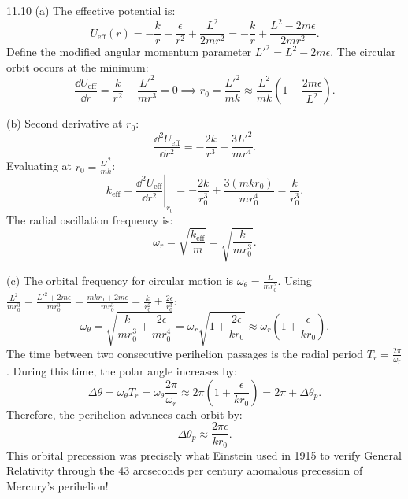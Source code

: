 \begin{tabletworkspace}[6.5cm]
\end{tabletworkspace}

\begin{solution}{11.10}
(a) The effective potential is:
\[
U_{\text{eff}}(r) = -\frac{k}{r} - \frac{\epsilon}{r^2} + \frac{L^2}{2mr^2} = -\frac{k}{r} + \frac{L^2 - 2m\epsilon}{2mr^2}.
\]
Define the modified angular momentum parameter $L'^2 = L^2 - 2m\epsilon$.
The circular orbit occurs at the minimum:
\[
\frac{\dd U_{\text{eff}}}{\dd r} = \frac{k}{r^2} - \frac{L'^2}{mr^3} = 0 \implies \boxed{r_0 = \frac{L'^2}{mk} \approx \frac{L^2}{mk}\left(1 - \frac{2m\epsilon}{L^2}\right).}
\]

(b) Second derivative at $r_0$:
\[
\frac{\dd^2 U_{\text{eff}}}{\dd r^2} = -\frac{2k}{r^3} + \frac{3L'^2}{mr^4}.
\]
Evaluating at $r_0 = \frac{L'^2}{mk}$:
\[
k_{\text{eff}} = \left.\frac{\dd^2 U_{\text{eff}}}{\dd r^2}\right|_{r_0} = -\frac{2k}{r_0^3} + \frac{3(mkr_0)}{mr_0^4} = \frac{k}{r_0^3}.
\]
The radial oscillation frequency is:
\[
\omega_r = \sqrt{\frac{k_{\text{eff}}}{m}} = \sqrt{\frac{k}{m r_0^3}}.
\]

(c) The orbital frequency for circular motion is $\omega_\theta = \frac{L}{m r_0^2}$.
Using $\frac{L^2}{m r_0^3} = \frac{L'^2 + 2m\epsilon}{m r_0^3} = \frac{m k r_0 + 2m\epsilon}{m r_0^3} = \frac{k}{r_0^2} + \frac{2\epsilon}{r_0^3}$:
\[
\omega_\theta = \sqrt{\frac{k}{m r_0^3} + \frac{2\epsilon}{m r_0^4}} = \omega_r \sqrt{1 + \frac{2\epsilon}{k r_0}} \approx \omega_r\left(1 + \frac{\epsilon}{k r_0}\right).
\]
The time between two consecutive perihelion passages is the radial period $T_r = \frac{2\pi}{\omega_r}$.
During this time, the polar angle increases by:
\[
\Delta\theta = \omega_\theta T_r = \omega_\theta \frac{2\pi}{\omega_r} \approx 2\pi\left(1 + \frac{\epsilon}{k r_0}\right) = 2\pi + \Delta\theta_p.
\]
Therefore, the perihelion advances each orbit by:
\[
\boxed{\Delta\theta_p \approx \frac{2\pi\epsilon}{k r_0}.}
\]
This orbital precession was precisely what Einstein used in 1915 to verify General Relativity through the 43 arcseconds per century anomalous precession of Mercury's perihelion!
\end{solution}
